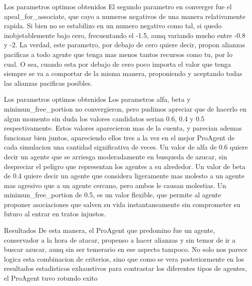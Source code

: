 \documentclass{beamer}
\begin{document}
\begin{frame}{Los parametros optimos obtenidos}
    El segundo parametro en converger fue el apeal_for_associate, que cayo a numeros negativos de una manera relativamente rapida. Si bien no se estabilizo en un numero negativo como tal, si quedo inobjetablemente bajo cero, frecuentando el -1.5, aunq variando mucho entre -0.8 y -2. La verdad, este parametro, por debajo de cero quiere decir, propon alianzas pacificas a todo agente que tenga mas menos tantos recursos como tu, por lo cual. O sea, cuando esta por debajo de cero poco importa el valor que tenga siempre se va a comportar de la misma manera, proponiendo y aceptando todas las alianzas pacificas posibles.
\end{frame}

\begin{frame}{Los parametros optimos obtenidos}
    Los parametros alfa, beta y minimun_free_portion no convergieron, pero pudimos apreciar que de hacerlo en algun momento sin duda los valores candidatos serian 0.6, 0.4 y 0.5 respectivamente. Estos valores aparecieron mas de la cuenta, y parecian ademas funcionar bien juntos, apareciendo ellos tres a la vez en el mejor ProAgent de cada simulacion una cantidad significativa de veces.
    Un valor de alfa de 0.6 quiere decir un agente que se arriesga moderadamente en busqueda de azucar, sin despreciar el peligro que representan los agentes a su alrededor.
    Un valor de beta de 0.4 quiere decir un agente que considera ligeramente mas molesto a un agente mas agresivo que a un agente cercano, pero ambos le causan molestias.
    Un minimun_free_portion de 0.5, es un valor flexible, que permite al agente proponer asociaciones que salven su vida instantaneamente sin comprometer su futuro al entrar en tratos injustos.
\end{frame}

\begin{frame}{Resultados}
    De esta manera, el ProAgent que predomino fue un agente, conservador a la hora de atacar, propenso a hacer alianzas y sin temor de ir a buscar azucar, aunq sin ser temerario en ese aspecto tampoco. No solo nos parece logica esta combinacion de criterios, sino que como se vera posteriormente en los resultados estadisticos exhaustivos para contrastar los diferentes tipos de agentes, el ProAgent tuvo rotundo exito
\end{frame}
\end{document}

